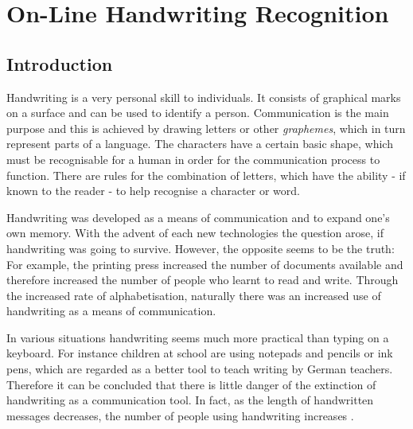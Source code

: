 ﻿%

\chapter{On-Line Handwriting Recognition}
\label{chap:onlinehwr}


\section{Introduction}
\label{sec:onlinehwrintroduction}


Handwriting is a very personal skill to individuals. It consists of graphical
marks on a surface and can be used to identify a person. Communication is the main purpose and this is achieved by drawing letters or other 
\emph{graphemes}, which in turn represent parts of a language.
The characters have a certain basic shape, which must be recognisable
for a human in order for the communication process to function.
There are rules for the combination of letters, which have the ability - if
known to the reader - to help recognise a character or word.

Handwriting was developed as a means of communication and to expand one's own
memory. With the advent of each new technologies the question arose, 
if handwriting was going to survive. However, the opposite seems to be the 
truth: For example, the printing press increased the number of documents
available and therefore increased the number of people who learnt to read
and write. Through the increased rate of alphabetisation, naturally there was
an increased use of handwriting as a means of communication.

In various situations handwriting seems much more practical than typing on a
keyboard. For instance children at school are using notepads and pencils or
ink pens, which are regarded as a better tool to teach writing by German 
teachers. Therefore it can be concluded that there is little danger of
the extinction of handwriting as a communication tool. In fact, as 
the length of handwritten messages decreases, the number of people using 
handwriting increases .

